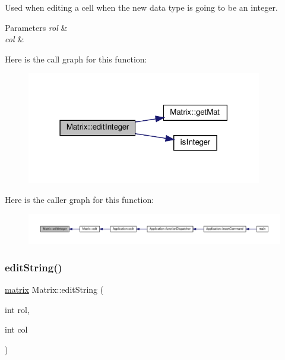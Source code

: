 Used when editing a cell when the new data type is going to be an integer. 
\begin{DoxyParams}{Parameters}
{\em rol} & \\
\hline
{\em col} & \\
\hline
\end{DoxyParams}
Here is the call graph for this function\+:\nopagebreak
\begin{figure}[H]
\begin{center}
\leavevmode
\includegraphics[width=291pt]{class_matrix_a91c66e2961a16adf56b8d58b916d2d46_cgraph}
\end{center}
\end{figure}
Here is the caller graph for this function\+:\nopagebreak
\begin{figure}[H]
\begin{center}
\leavevmode
\includegraphics[width=350pt]{class_matrix_a91c66e2961a16adf56b8d58b916d2d46_icgraph}
\end{center}
\end{figure}
\mbox{\label{class_matrix_a7029d8a3cd3c691b46adfd777abc880c}} 
\subsubsection{\texorpdfstring{edit\+String()}{editString()}}
{\footnotesize\ttfamily \hyperlink{formula_8h_a869e2a5deeb3daa4c82d6bc91cf20d92}{matrix} Matrix\+::edit\+String (\begin{DoxyParamCaption}\item[{int}]{rol,  }\item[{int}]{col }\end{DoxyParamCaption})\hspace{0.3cm}{\ttfamily [private]}}

